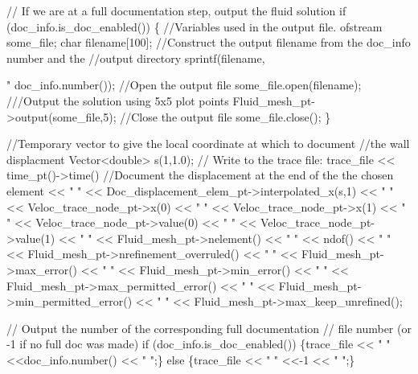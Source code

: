 \begin{DoxyCodeInclude}
    
  \textcolor{comment}{// If we are at a full documentation step, output the fluid solution}
  \textcolor{keywordflow}{if} (doc\_info.is\_doc\_enabled())
   \{
    \textcolor{comment}{//Variables used in the output file.}
    ofstream some\_file; \textcolor{keywordtype}{char} filename[100];
    \textcolor{comment}{//Construct the output filename from the doc\_info number and the}
    \textcolor{comment}{//output directory}
    sprintf(filename,\textcolor{stringliteral}{"%
            doc\_info.number());
    \textcolor{comment}{//Open the output file}
    some\_file.open(filename);\textcolor{comment}{}
\textcolor{comment}{    ///Output the solution using 5x5 plot points }
\textcolor{comment}{}    Fluid\_mesh\_pt->output(some\_file,5);
    \textcolor{comment}{//Close the output file}
    some\_file.close();
   \} 
 
  \textcolor{comment}{//Temporary vector to give the local coordinate at which to document}
  \textcolor{comment}{//the wall displacment}
  Vector<double> s(1,1.0);
  \textcolor{comment}{// Write to the trace file: }
  trace\_file << time\_pt()->time()  
   \textcolor{comment}{//Document the displacement at the end of the the chosen element}
             << \textcolor{stringliteral}{" "} << Doc\_displacement\_elem\_pt->interpolated\_x(s,1) 
             << \textcolor{stringliteral}{" "} << Veloc\_trace\_node\_pt->x(0)  
             << \textcolor{stringliteral}{" "} << Veloc\_trace\_node\_pt->x(1)  
             << \textcolor{stringliteral}{" "} << Veloc\_trace\_node\_pt->value(0)  
             << \textcolor{stringliteral}{" "} << Veloc\_trace\_node\_pt->value(1)  
             << \textcolor{stringliteral}{" "} << Fluid\_mesh\_pt->nelement() 
             << \textcolor{stringliteral}{" "} << ndof() 
             << \textcolor{stringliteral}{" "} << Fluid\_mesh\_pt->nrefinement\_overruled() 
             << \textcolor{stringliteral}{" "} << Fluid\_mesh\_pt->max\_error()  
             << \textcolor{stringliteral}{" "} << Fluid\_mesh\_pt->min\_error() 
             << \textcolor{stringliteral}{" "} << Fluid\_mesh\_pt->max\_permitted\_error()  
             << \textcolor{stringliteral}{" "} << Fluid\_mesh\_pt->min\_permitted\_error()  
             << \textcolor{stringliteral}{" "} << Fluid\_mesh\_pt->max\_keep\_unrefined();

  \textcolor{comment}{// Output the number of the corresponding full documentation  }
  \textcolor{comment}{// file number (or -1 if no full doc was made)}
  \textcolor{keywordflow}{if} (doc\_info.is\_doc\_enabled()) 
   \{trace\_file << \textcolor{stringliteral}{" "} <<doc\_info.number()  << \textcolor{stringliteral}{" "};\}
  \textcolor{keywordflow}{else} \{trace\_file << \textcolor{stringliteral}{" "} <<-1  << \textcolor{stringliteral}{" "};\}
  
}
\end{DoxyCodeInclude}
